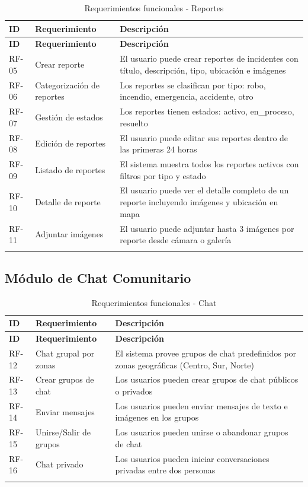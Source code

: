 \documentclass[12pt,a4paper]{article}
\begin{document}
\begin{longtable}{|p{1.5cm}|p{4cm}|p{8cm}|}
\hline
\textbf{ID} & \textbf{Requerimiento} & \textbf{Descripción} \\
\hline
\endfirsthead
\hline
\textbf{ID} & \textbf{Requerimiento} & \textbf{Descripción} \\
\hline
\endhead
RF-05 & Crear reporte & El usuario puede crear reportes de incidentes con título, descripción, tipo, ubicación e imágenes \\
\hline
RF-06 & Categorización de reportes & Los reportes se clasifican por tipo: robo, incendio, emergencia, accidente, otro \\
\hline
RF-07 & Gestión de estados & Los reportes tienen estados: activo, en\_proceso, resuelto \\
\hline
RF-08 & Edición de reportes & El usuario puede editar sus reportes dentro de las primeras 24 horas \\
\hline
RF-09 & Listado de reportes & El sistema muestra todos los reportes activos con filtros por tipo y estado \\
\hline
RF-10 & Detalle de reporte & El usuario puede ver el detalle completo de un reporte incluyendo imágenes y ubicación en mapa \\
\hline
RF-11 & Adjuntar imágenes & El usuario puede adjuntar hasta 3 imágenes por reporte desde cámara o galería \\
\hline
\caption{Requerimientos funcionales - Reportes}
\end{longtable}

\subsection{Módulo de Chat Comunitario}

\begin{longtable}{|p{1.5cm}|p{4cm}|p{8cm}|}
\hline
\textbf{ID} & \textbf{Requerimiento} & \textbf{Descripción} \\
\hline
\endfirsthead
\hline
\textbf{ID} & \textbf{Requerimiento} & \textbf{Descripción} \\
\hline
\endhead
RF-12 & Chat grupal por zonas & El sistema provee grupos de chat predefinidos por zonas geográficas (Centro, Sur, Norte) \\
\hline
RF-13 & Crear grupos de chat & Los usuarios pueden crear grupos de chat públicos o privados \\
\hline
RF-14 & Enviar mensajes & Los usuarios pueden enviar mensajes de texto e imágenes en los grupos \\
\hline
RF-15 & Unirse/Salir de grupos & Los usuarios pueden unirse o abandonar grupos de chat \\
\hline
RF-16 & Chat privado & Los usuarios pueden iniciar conversaciones privadas entre dos personas \\
\hline
\caption{Requerimientos funcionales - Chat}
\end{longtable}
\end{document}
